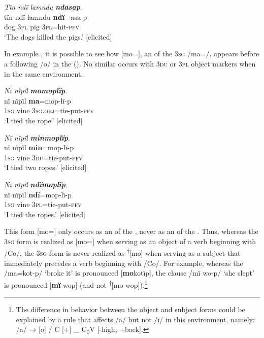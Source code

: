 \ea%
    \label{ex:det:36}
          \textit{Tïn ndï lamndu} \textbf{\textit{ndasap}}.\\
\gll tïn    ndï  lamndu  \textbf{ndï=}asa-p\\
    dog  3\textsc{pl}  pig      3\textsc{pl}=hit-\textsc{pfv}\\
\glt `The dogs killed the pigs.’ [elicited]
\z

In example , it is possible to see how [mo=], an  of the 3\textsc{sg}  /ma=/, appears before a following /o/ in the  (). No similar  occurs with \textsc{3du}  or \textsc{3pl}  object markers when in the same environment.

\ea%
    \label{ex:det:37}
          \textit{Nï nïpïl} \textbf{\textit{momoplïp}}.\\
\gll nï    nïpïl  \textbf{ma}=mop-lï-p\\
    1\textsc{sg}  vine  3\textsc{sg.obj}=tie-put-\textsc{pfv}\\
\glt `I tied the rope.’ [elicited]
\z

\ea%
    \label{ex:det:38}
          \textit{Nï nïpïl} \textbf{\textit{minmoplïp}}.\\
\gll nï    nïpïl  \textbf{min}=mop-lï-p\\
    1\textsc{sg}  vine  3\textsc{du}=tie-put-\textsc{pfv}\\
\glt `I tied two ropes.’ [elicited]
\z

\ea%
    \label{ex:det:39}
          \textit{Nï nïpïl} \textbf{\textit{ndïmoplïp}}.\\
\gll nï    nïpïl  \textbf{ndï}=mop-lï-p\\
    1\textsc{sg}  vine  3\textsc{pl}=tie-put-\textsc{pfv}\\
\glt `I tied the ropes.’ [elicited]
\z

This form [mo=] only occurs as an  of the , never as an  of the . Thus, whereas the 3\textsc{sg} form is realized as [mo=] when serving as an object of a verb beginning with /Co/, the 3\textsc{sg} form is never realized as \textsuperscript{†}[mo] when serving as a subject that immediately precedes a verb beginning with /Co/. For example, whereas the  /ma=kot-p/ ‘broke it’ is pronounced [\textbf{mo}kotïp], the clause /mï wo-p/ ‘she slept’ is pronounced [\textbf{mï} wop] (and not \textsuperscript{†}[mo wop]).\footnote{The difference in behavior between the object and subject forms could be explained by a  rule that affects /a/ but not /ï/ in this environment, namely: \newline /a/ → [o] / C [+] \_ C\textsubscript{0}V [-high, +back].}

